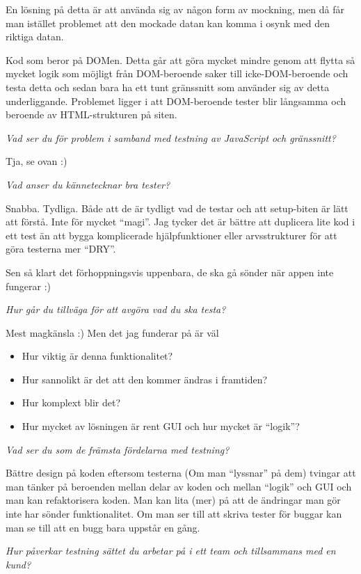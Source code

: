 \documentclass[11pt]{article}
\begin{document}
En lösning på detta är att använda sig av någon form av mockning, men då
får man istället problemet att den mockade datan kan komma i osynk med den
riktiga datan.

Kod som beror på DOMen. Detta går att göra mycket mindre genom att flytta
så mycket logik som möjligt från DOM-beroende saker till icke-DOM-beroende
och testa detta och sedan bara ha ett tunt gränssnitt som använder sig av
detta underliggande. Problemet ligger i att DOM-beroende tester blir
långsamma och beroende av HTML-strukturen på siten.

\emph{Vad ser du för problem i samband med testning av JavaScript och
gränssnitt?}

Tja, se ovan :)

\emph{Vad anser du kännetecknar bra tester?}

Snabba. Tydliga. Både att de är tydligt vad de testar och att setup-biten
är lätt att förstå. Inte för mycket ``magi''. Jag tycker det är bättre att
duplicera lite kod i ett test än att bygga komplicerade hjälpfunktioner
eller arvsstrukturer för att göra testerna mer ``DRY''.

Sen så klart det förhoppningsvis uppenbara, de ska gå sönder när appen
inte fungerar :)

\emph{Hur går du tillväga för att avgöra vad du ska testa?}

Mest magkänsla :) Men det jag funderar på är väl

\begin{itemize}
\item Hur viktig är denna funktionalitet?
\item Hur sannolikt är det att den kommer ändras i framtiden?
\item Hur komplext blir det?
\item Hur mycket av lösningen är rent GUI och hur mycket är ``logik''?
\end{itemize}

\emph{Vad ser du som de främsta fördelarna med testning?}

Bättre design på koden eftersom testerna (Om man ``lyssnar'' på dem) tvingar
att man tänker på beroenden mellan delar av koden och mellan ``logik'' och
GUI och man kan refaktorisera koden. Man kan lita (mer) på att de
ändringar man gör inte har sönder funktionalitet. Om man ser till att
skriva tester för buggar kan man se till att en bugg bara uppstår en gång.

\emph{Hur påverkar testning sättet du arbetar på i ett team och tillsammans
med en kund?}
\end{document}
